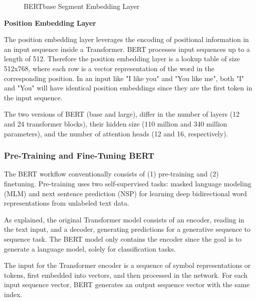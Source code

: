 \begin{figure}
{
    }
    \caption{BERTbase Segment Embedding Layer}
    \label{fig:BERT_segmentEmbedding}
\end{figure}


\textbf{Position Embedding Layer}

The position embedding layer leverages the encoding of positional information in an input sequence inside a Transformer. BERT processes input sequences up to a length of 512. Therefore the position embedding layer is a lookup table of size 512x768, where each row is a vector representation of the word in the corresponding position. In an input like "I like you" and "You like me", both "I" and "You" will have identical position embeddings since they are the first token in the input sequence. 

The two versions of BERT (base and large), differ in the number of layers (12 and 24 transformer blocks), their hidden size (110 million and 340 million parameters), and the number of attention heads (12 and 16, respectively).

\subsubsection{Pre-Training and Fine-Tuning BERT}
\label{sec:bert_pre-fine}
The BERT workflow conventionally consists of (1) pre-training and (2) finetuning. Pre-training uses two self-supervised tasks: masked language modeling (MLM) and next sentence prediction (NSP) for learning deep bidirectional word representations from unlabeled text data.

As explained, the original Transformer model consists of an encoder, reading in the text input, and a decoder, generating predictions for a generative sequence to sequence task. The BERT model only contains the encoder since the goal is to generate a language model, solely for classification tasks.

The input for the Transformer encoder is a sequence of symbol representations or tokens, first embedded into vectors, and then processed in the network. For each input sequence vector, BERT generates an output sequence vector with the same index.

